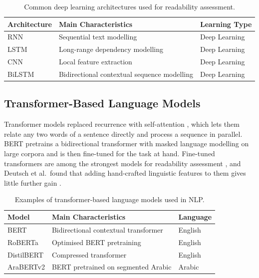 \begin{table}[H]
\centering
\caption{Common deep learning architectures used for readability assessment.}
\label{tab:deep_learning_readability}
\begin{tabular}{p{3.6cm} p{5.6cm} p{2.2cm}}
\toprule
\textbf{Architecture} & \textbf{Main Characteristics} & \textbf{Learning Type} \\
\midrule
RNN & Sequential text modelling & Deep Learning \\
LSTM & Long-range dependency modelling & Deep Learning \\
CNN & Local feature extraction & Deep Learning \\
BiLSTM & Bidirectional contextual sequence modelling & Deep Learning \\
\bottomrule
\end{tabular}
\end{table}

\subsection{Transformer-Based Language Models}

Transformer models replaced recurrence with self-attention \cite{vaswani2017attention}, which
lets them relate any two words of a sentence directly and process a sequence in parallel. BERT
\cite{devlin2019bert} pretrains a bidirectional transformer with masked language modelling on
large corpora and is then fine-tuned for the task at hand. Fine-tuned transformers are among the
strongest models for readability assessment \cite{martinc2021supervised}, and Deutsch et al.\
found that adding hand-crafted linguistic features to them gives little further gain
\cite{deutsch2020linguistic}.

\begin{table}[H]
\centering
\caption{Examples of transformer-based language models used in NLP.}
\label{tab:transformer_models}
\begin{tabular}{p{3.6cm} p{5.6cm} p{2.2cm}}
\toprule
\textbf{Model} & \textbf{Main Characteristics} & \textbf{Language} \\
\midrule
BERT & Bidirectional contextual transformer & English \\
RoBERTa & Optimised BERT pretraining & English \\
DistilBERT & Compressed transformer & English \\
AraBERTv2 & BERT pretrained on segmented Arabic & Arabic \\
\bottomrule
\end{tabular}
\end{table}

